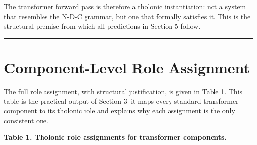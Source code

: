 \documentclass[12pt]{article}
\begin{document}
The transformer forward pass is therefore a tholonic instantiation: not
a system that resembles the N-D-C grammar, but one that formally
satisfies it. This is the structural premise from which all predictions
in Section 5 follow.

\begin{center}\rule{0.5\linewidth}{0.5pt}\end{center}

\section{Component-Level Role Assignment}\label{component-level-role-assignment}

The full role assignment, with structural justification, is given in
Table 1. This table is the practical output of Section 3: it maps every
standard transformer component to its tholonic role and explains why
each assignment is the only consistent one.

\textbf{Table 1. Tholonic role assignments for transformer components.}
\end{document}
